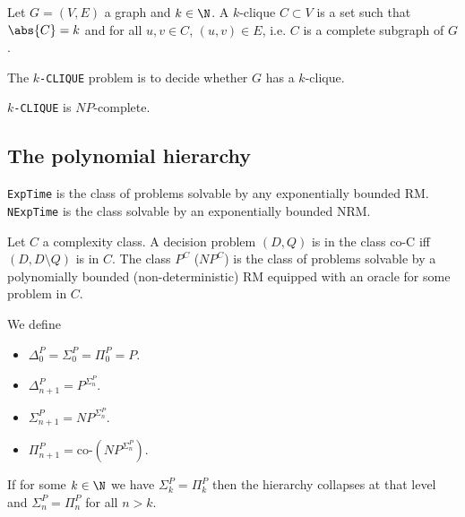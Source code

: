\documentclass{article}
\begin{document}
\begin{definition*}[CLIQUE]
	Let $G=(V,E)$ a graph and $k\in\N$. A $k$-clique $C\subset V$ is a 
	set such that $\abs{C} = k$ and for all $u,v\in C$, $(u,v)\in E$,
	i.e. $C$ is a complete subgraph of $G$.

	The \texttt{$k$-CLIQUE} problem is to decide whether $G$ has a $k$-clique.
\end{definition*}

\begin{theorem*}[II.22]
	\texttt{$k$-CLIQUE} is $NP$-complete.	
\end{theorem*}

\subsection{The polynomial hierarchy}

\begin{definition*}[ExpTime]
	\texttt{ExpTime} is the class of problems solvable by any exponentially
	bounded RM. \texttt{NExpTime} is the class solvable by an exponentially
	bounded NRM.	
\end{definition*}

\begin{definition*}
	Let $C$ a complexity class. A decision problem $(D,Q)$ is in the class
	co-C iff $(D, D\setminus Q)$ is in $C$. The class $P^C$ ($NP^C$) is the 
	class of problems solvable by a polynomially bounded (non-deterministic)
	RM equipped with an oracle for some problem in $C$.

	We define 
	\begin{itemize}
		\item $\Delta_0^P=\Sigma_0^P=\Pi_0^P=P$.
		\item $\Delta_{n+1}^P=P^{\Sigma_n^P}$.
		\item $\Sigma_{n+1}^P=NP^{\Sigma_n^P}$.
		\item $\Pi_{n+1}^P=\text{co-}\left(NP^{\Sigma_n^P}\right)$.
	\end{itemize}
\end{definition*}

\begin{theorem*}[II.26]
	If for some $k\in\N$ we have $\Sigma_k^P = \Pi_k^P$ then the hierarchy 
	collapses at that level and $\Sigma_n^P = \Pi_n^P$ for all $n>k$.
\end{theorem*}
\end{document}
